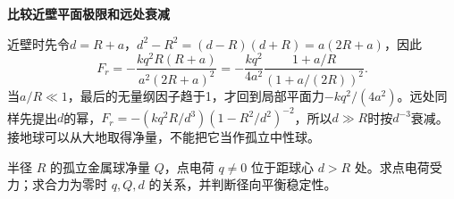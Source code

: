 \begin{solution}
\par\medskip{}\noindent\textbf{比较近壁平面极限和远处衰减}\par\nobreak
近壁时先令$d=R+a$，$d^2-R^2=(d-R)(d+R)=a(2R+a)$，因此
\[
F_r=-\frac{kq^2R(R+a)}{a^2(2R+a)^2}
=-\frac{kq^2}{4a^2}\frac{1+a/R}{(1+a/(2R))^2}.
\]
当$a/R\ll1$，最后的无量纲因子趋于1，才回到局部平面力$-kq^2/(4a^2)$。远处同样先提出$d$的幂，$F_r=-(kq^2R/d^3)(1-R^2/d^2)^{-2}$，所以$d\gg R$时按$d^{-3}$衰减。接地球可以从大地取得净量，不能把它当作孤立中性球。\end{solution}
\begin{question}\begin{example}[孤立带电球的力为零条件]\label{e3:example:9}
半径 $R$ 的孤立金属球净量 $Q$，点电荷 $q\ne0$ 位于距球心 $d>R$ 处。求点电荷受力；求合力为零时 $q,Q,d$ 的关系，并判断径向平衡稳定性。
\end{example}
\end{question}
